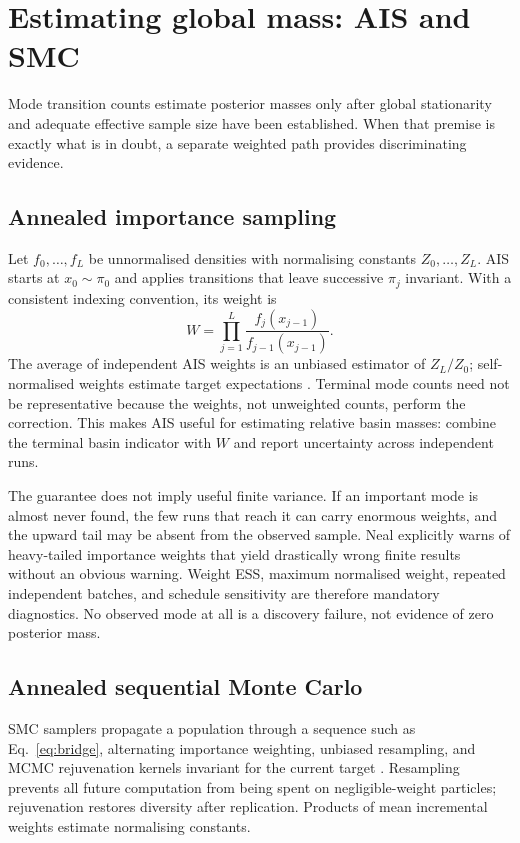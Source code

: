 \documentclass[11pt]{article}
\begin{document}
\section{Estimating global mass: AIS and SMC}

Mode transition counts estimate posterior masses only after global stationarity and
adequate effective sample size have been established.  When that premise is exactly
what is in doubt, a separate weighted path provides discriminating evidence.

\subsection{Annealed importance sampling}

Let $f_0,\ldots,f_L$ be unnormalised densities with normalising constants
$Z_0,\ldots,Z_L$.  AIS starts at $x_0\sim\pi_0$ and applies transitions that leave
successive $\pi_j$ invariant.  With a consistent indexing convention, its weight is
\begin{equation}
  W=\prod_{j=1}^{L}\frac{f_j(x_{j-1})}{f_{j-1}(x_{j-1})}.
  \label{eq:ais-weight}
\end{equation}
The average of independent AIS weights is an unbiased estimator of $Z_L/Z_0$;
self-normalised weights estimate target expectations \citep{neal2001ais}.  Terminal
mode counts need not be representative because the weights, not unweighted counts,
perform the correction.  This makes AIS useful for estimating relative basin masses:
combine the terminal basin indicator with $W$ and report uncertainty across
independent runs.

The guarantee does not imply useful finite variance.  If an important mode is almost
never found, the few runs that reach it can carry enormous weights, and the upward
tail may be absent from the observed sample.  Neal explicitly warns of heavy-tailed
importance weights that yield drastically wrong finite results without an obvious
warning.  Weight ESS, maximum normalised weight, repeated independent batches, and
schedule sensitivity are therefore mandatory diagnostics.  No observed mode at all
is a discovery failure, not evidence of zero posterior mass.

\subsection{Annealed sequential Monte Carlo}

SMC samplers propagate a population through a sequence such as
Eq.~\eqref{eq:bridge}, alternating importance weighting, unbiased resampling, and
MCMC rejuvenation kernels invariant for the current target
\citep{delmoral2002smc,delmoral2006smc}.  Resampling prevents all future computation
from being spent on negligible-weight particles; rejuvenation restores diversity
after replication.  Products of mean incremental weights estimate normalising
constants.
\end{document}
